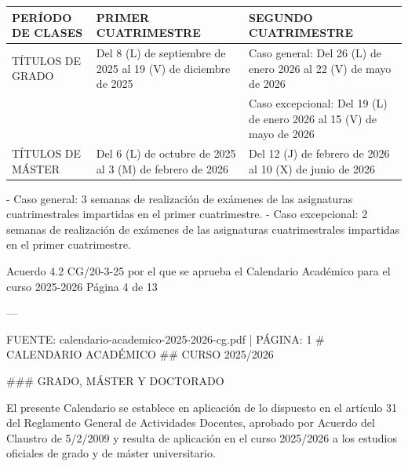 \documentclass{article}
\begin{document}
\begin{itemize}
\begin{itemize}
\begin{scriptsize}
                  \vspace{0.4cm}
                  \begin{table}[h!]\centering\renewcommand{\arraystretch}{1.3}
                    \begin{tabular}{|p{}|p{}|p{}|}\hline
                      PERÍODO DE CLASES & PRIMER CUATRIMESTRE                                            & SEGUNDO CUATRIMESTRE                                                 \\\hline
                      TÍTULOS DE GRADO  & Del 8 (L) de septiembre de 2025 al 19 (V) de diciembre de 2025 & Caso general: Del 26 (L) de enero 2026 al 22 (V) de mayo de 2026     \\\hline
                                        &                                                                & Caso excepcional: Del 19 (L) de enero 2026 al 15 (V) de mayo de 2026 \\\hline
                      TÍTULOS DE MÁSTER & Del 6 (L) de octubre de 2025 al 3 (M) de febrero de 2026       & Del 12 (J) de febrero de 2026 al 10 (X) de junio de 2026             \\\hline
                    \end{tabular}\end{table}
                  \vspace{0.4cm}

                  - Caso general: 3 semanas de realización de exámenes de las asignaturas cuatrimestrales impartidas en el primer cuatrimestre.
                  - Caso excepcional: 2 semanas de realización de exámenes de las asignaturas cuatrimestrales impartidas en el primer cuatrimestre.

                  Acuerdo 4.2 CG/20-3-25 por el que se aprueba el Calendario Académico para el curso 2025-2026  Página 4 de 13

                  ---

                  FUENTE: calendario-academico-2025-2026-cg.pdf | PÁGINA: 1
                  \# CALENDARIO ACADÉMICO
                  \#\# CURSO 2025/2026

                  \#\#\# GRADO, MÁSTER Y DOCTORADO

                  El presente Calendario se establece en aplicación de lo dispuesto en el artículo 31 del Reglamento General de Actividades Docentes, aprobado por Acuerdo del Claustro de 5/2/2009 y resulta de aplicación en el curso 2025/2026 a los estudios oficiales de grado y de máster universitario.


\end{scriptsize}
\end{itemize}
\end{itemize}
\end{document}
